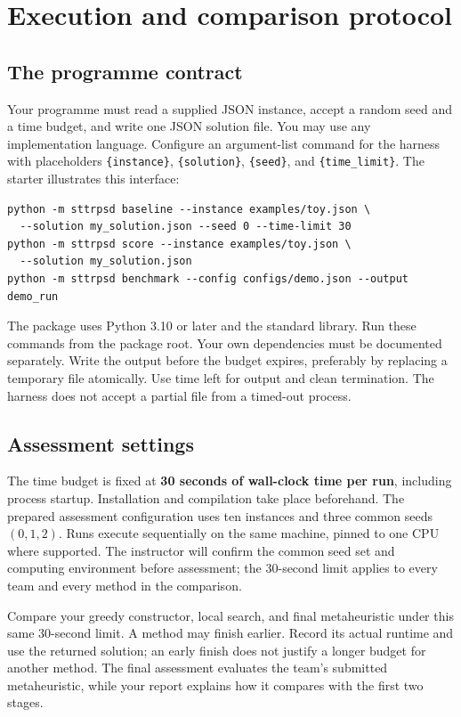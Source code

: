 \documentclass[11pt,a4paper]{article}
\newcommand{\code}[1]{{\small\texttt{#1}}}
\begin{document}
\section{Execution and comparison protocol}
\subsection{The programme contract}
Your programme must read a supplied JSON instance, accept a random seed and a time budget, and write one JSON solution file. You may use any implementation language. Configure an argument-list command for the harness with placeholders \code{\{instance\}}, \code{\{solution\}}, \code{\{seed\}}, and \code{\{time\_limit\}}. The starter illustrates this interface:

\begin{lstlisting}
python -m sttrpsd baseline --instance examples/toy.json \
  --solution my_solution.json --seed 0 --time-limit 30
python -m sttrpsd score --instance examples/toy.json \
  --solution my_solution.json
python -m sttrpsd benchmark --config configs/demo.json --output demo_run
\end{lstlisting}
The package uses Python 3.10 or later and the standard library. Run these commands from the package root. Your own dependencies must be documented separately. Write the output before the budget expires, preferably by replacing a temporary file atomically. Use time left for output and clean termination. The harness does not accept a partial file from a timed-out process.

\Needspace{6\baselineskip}
\subsection{Assessment settings}
The time budget is fixed at \textbf{30 seconds of wall-clock time per run}, including process startup. Installation and compilation take place beforehand. The prepared assessment configuration uses ten instances and three common seeds $(0,1,2)$. Runs execute sequentially on the same machine, pinned to one CPU where supported. The instructor will confirm the common seed set and computing environment before assessment; the 30-second limit applies to every team and every method in the comparison.

Compare your greedy constructor, local search, and final metaheuristic under this same 30-second limit. A method may finish earlier. Record its actual runtime and use the returned solution; an early finish does not justify a longer budget for another method. The final assessment evaluates the team's submitted metaheuristic, while your report explains how it compares with the first two stages.
\end{document}
